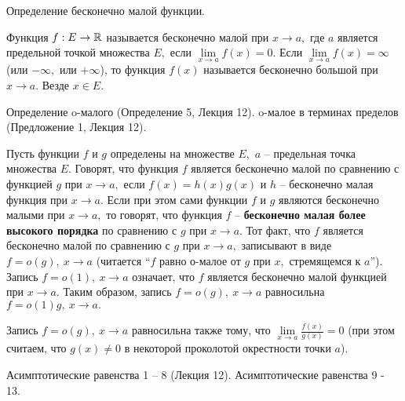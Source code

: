 \newpage
\begin{problem}
Определение бесконечно малой функции.
\end{problem}

\begin{definition} Функция $f: E\rightarrow\mathbb{R}$
	называется бесконечно малой при
	$x\rightarrow a,$ где $a$ является предельной
	точкой множества $E,$ если
	$\lim\limits_{x\rightarrow a}f(x)=0.$
	Если
	$\lim\limits_{x\rightarrow a}f(x)
		=\infty$ (или $-\infty,$
	или $+\infty$), то функция
	$f(x)$ называется бесконечно большой
	при $x\rightarrow a.$ Везде $x \in E.$
\end{definition}


\newpage
\begin{problem}
Определение o-малого (Определение 5, Лекция 12). o-малое в терминах пределов
(Предложение 1, Лекция 12).
\end{problem}


\begin{definition} Пусть функции
	$f$ и $g$ определены на множестве
	$E,$ $a$ -- предельная точка множества
	$E.$ Говорят, что функция $f$ является
	бесконечно малой по сравнению с функцией
	$g$ при $x\rightarrow a,$ если
	$f(x)=h(x)g(x)$ и $h$ -- бесконечно
	малая функция при $x\rightarrow a.$
	Если при этом сами функции $f$ и $g$
	являются бесконечно малыми при
	$x\rightarrow a,$ то говорят, что
	функция $f$ -- \textbf{бесконечно
		малая более высокого порядка} по сравнению
	с $g$ при $x\rightarrow a.$
	Тот факт, что $f$ является бесконечно
	малой по сравнению с $g$ при $x\rightarrow a,$
	записывают в виде $f=o(g), \ x\rightarrow a$
	(читается ``$f$ равно о-малое от $g$ при
	$x,$ стремящемся к $a$''). Запись $f=o(1), \
		x\rightarrow a$ означает, что $f$ является
	бесконечно малой функцией при
	$x\rightarrow a.$ Таким образом,
	запись $f=o(g), \ x\rightarrow a$
	равносильна $f=o(1)g, \ x\rightarrow a.$
\end{definition}

\begin{lemma}
	Запись $f=o(g), \ x\rightarrow a$ равносильна
	также тому,
	что $\lim\limits_{x\rightarrow a}
		\frac{f(x)}{g(x)}=0$
	(при этом считаем, что $g(x)\neq0$
	в некоторой проколотой окрестности
	точки $a$).
\end{lemma}

\newpage
\begin{problem}
Асимптотические равенства 1 – 8 (Лекция 12). Асимптотические равенства 9 - 13.
\end{problem}

